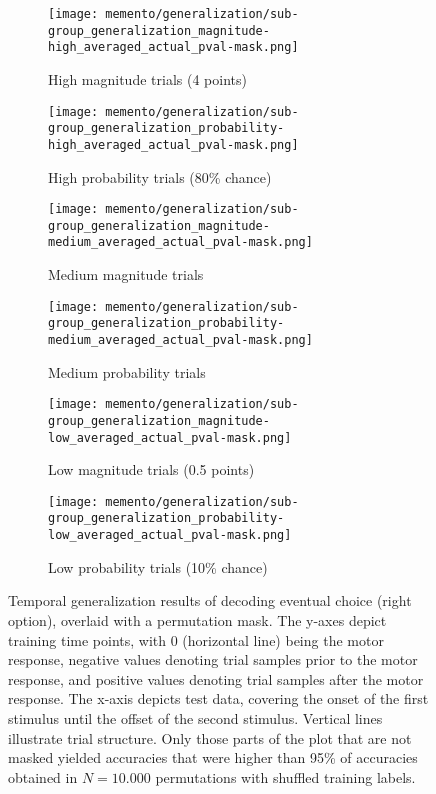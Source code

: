 \begin{figure}
	\begin{subfigure}[c]{0.5\textwidth}
		\texttt{[image: memento/generalization/sub-group\_generalization\_magnitude-high\_averaged\_actual\_pval-mask.png]}
		\caption{High magnitude trials (4 points)}
		\label{fig:generalization-mag-high-actual}
	\end{subfigure}
	\begin{subfigure}[c]{0.5\textwidth}
		\texttt{[image: memento/generalization/sub-group\_generalization\_probability-high\_averaged\_actual\_pval-mask.png]}
		\caption{High probability trials (80\% chance)}
		\label{fig:generalization-prob-high-actual}
	\end{subfigure}
	\hfill
	\begin{subfigure}[c]{0.5\textwidth}
		\texttt{[image: memento/generalization/sub-group\_generalization\_magnitude-medium\_averaged\_actual\_pval-mask.png]}
		\caption{Medium magnitude trials}
		\label{fig:generalization-mag-medium-actual}
	\end{subfigure}
	\begin{subfigure}[c]{0.5\textwidth}
		\texttt{[image: memento/generalization/sub-group\_generalization\_probability-medium\_averaged\_actual\_pval-mask.png]}
		\caption{Medium probability trials}
		\label{fig:generalization-prob-medium-actual}
	\end{subfigure}
	\hfill
	\begin{subfigure}[c]{0.5\textwidth}
		\texttt{[image: memento/generalization/sub-group\_generalization\_magnitude-low\_averaged\_actual\_pval-mask.png]}
		\caption{Low magnitude trials (0.5 points)}
		\label{fig:generalization-mag-low-actual}
	\end{subfigure}
	\begin{subfigure}[c]{0.5\textwidth}
		\texttt{[image: memento/generalization/sub-group\_generalization\_probability-low\_averaged\_actual\_pval-mask.png]}
		\caption{Low probability trials (10\% chance)}
		\label{fig:generalization-prob-low-actual}
	\end{subfigure}
	\caption[Temporal generalization: Eventual choice]{Temporal generalization results of decoding eventual choice (right option), overlaid with a permutation mask. The y-axes depict training time points, with 0 (horizontal line) being the motor response, negative values denoting trial samples prior to the motor response, and positive values denoting trial samples after the motor response. The x-axis depicts test data, covering the onset of the first stimulus until the offset of the second stimulus. Vertical lines illustrate trial structure. Only those parts of the plot that are not masked yielded accuracies that were higher than 95\% of accuracies obtained in $N=10.000$ permutations with shuffled training labels.}
	\label{fig:temporal-generalization-actual}
\end{figure}


